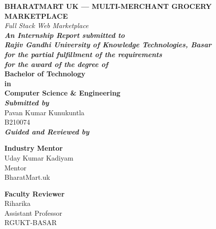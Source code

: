 \documentclass[12pt,a4paper]{report}
\begin{document}
\thispagestyle{empty}
\begin{center}
    \vspace*{0.5cm}
    \textbf{\Large BHARATMART UK --- MULTI-MERCHANT \vspace{5pt} GROCERY MARKETPLACE} \\[0.5cm]
    \textit{Full Stack Web Marketplace} \\[0.5cm]

    \textbf{\textit{An Internship Report submitted to}} \\
    \textbf{\textit{Rajiv Gandhi University of Knowledge Technologies, Basar}} \\
    \textbf{\textit{for the partial fulfillment of the requirements}} \\
    \textbf{\textit{for the award of the degree of}} \\[0.8cm]

    \textbf{\Large Bachelor of Technology} \\
    \textbf{in} \\
    \textbf{\Large Computer Science \& Engineering} \\[0.8cm]

    \textbf{\textit{Submitted by}} \\[0.5cm]

    Pavan Kumar Kunukuntla \\
    B210074 \\[1cm]

    \textbf{\textit{Guided and Reviewed by}} \\[0.8cm]
\end{center}

\begin{minipage}[t]{0.5\textwidth}
    \begin{flushleft}
        \textbf{Industry Mentor} \\[0.5cm]
        Uday Kumar Kadiyam \\
        Mentor \\
        BharatMart.uk
    \end{flushleft}
\end{minipage}%
\begin{minipage}[t]{0.5\textwidth}
    \begin{flushright}
        \textbf{Faculty Reviewer} \\[0.5cm]
        Riharika \\
        Assistant Professor \\
        RGUKT-BASAR
    \end{flushright}
\end{minipage}
\end{document}
